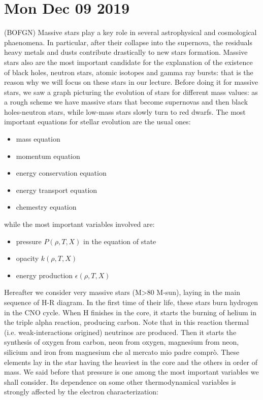 \documentclass[main.tex]{subfiles}
\begin{document}
\section*{Mon Dec 09 2019}

(BOFGN)
Massive stars play a key role in several astrophysical and cosmological phaenomena. In particular, after their collapse into the supernova, the residuals heavy metals and dusts contribute drastically to new stars formation. Massive stars also are the most important candidate for the explanation of the existence of black holes, neutron stars, atomic isotopes and gamma ray bursts: that is the reason why we will focus on these stars in our lecture. Before doing it for massive stars, we saw a graph picturing the evolution of stars for different mass values: as a rough scheme we have massive stars that become supernovas and then black holes-neutron stars, while low-mass stars slowly turn to red dwarfs.
The most important equations for stellar evolution are the usual ones:
\begin{itemize}
    \item mass equation
    \item momentum equation
    \item energy conservation equation
    \item energy transport equation
    \item chemestry equation
\end{itemize}
while the most important variables involved are:
\begin{itemize}
    \item pressure $P(\rho,T,X)$ in the equation of state
    \item opacity $k(\rho,T,X)$
    \item energy production $\epsilon(\rho,T,X)$
\end{itemize}
Hereafter we consider very massive stars (M>80 M-sun), laying in the main sequence of H-R diagram. In the first time of their life, these stars burn hydrogen in the CNO cycle. When H finishes in the core, it starts the burning of helium in the triple alpha reaction, producing carbon. Note that in this reaction thermal (i.e. weak-interactions origined) neutrinos are produced. Then it starts the synthesis of oxygen from carbon, neon from oxygen, magnesium from neon, silicium and iron from magnesium che al mercato mio padre comprò. These elements lay in the star having the heaviest in the core and the others in order of mass.
We said before that pressure is one among the most important variables we shall consider. Its dependence on some other thermodynamical variables is strongly affected by the electron characterization:
\end{document}

